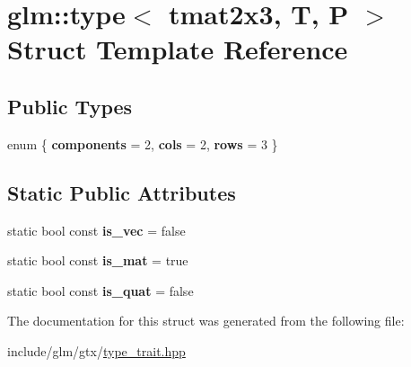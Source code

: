 \hypertarget{structglm_1_1type_3_01tmat2x3_00_01T_00_01P_01_4}{}\section{glm\+:\+:type$<$ tmat2x3, T, P $>$ Struct Template Reference}
\label{structglm_1_1type_3_01tmat2x3_00_01T_00_01P_01_4}
\subsection*{Public Types}
\begin{DoxyCompactItemize}
\item 
\mbox{\label{structglm_1_1type_3_01tmat2x3_00_01T_00_01P_01_4_a0e36075ad18b3fc9ca89e50736e389b0}} 
enum \{ {\bfseries components} = 2, 
{\bfseries cols} = 2, 
{\bfseries rows} = 3
 \}
\end{DoxyCompactItemize}
\subsection*{Static Public Attributes}
\begin{DoxyCompactItemize}
\item 
\mbox{\label{structglm_1_1type_3_01tmat2x3_00_01T_00_01P_01_4_aaf1b59c556fe102c644d35df40e27dda}} 
static bool const {\bfseries is\+\_\+vec} = false
\item 
\mbox{\label{structglm_1_1type_3_01tmat2x3_00_01T_00_01P_01_4_a6ab5d376d2ef7072813e3836fc9ccf95}} 
static bool const {\bfseries is\+\_\+mat} = true
\item 
\mbox{\label{structglm_1_1type_3_01tmat2x3_00_01T_00_01P_01_4_a2d2bbd03e889bb34375c236c196af7c4}} 
static bool const {\bfseries is\+\_\+quat} = false
\end{DoxyCompactItemize}


The documentation for this struct was generated from the following file\+:\begin{DoxyCompactItemize}
\item 
include/glm/gtx/\hyperlink{type__trait_8hpp}{type\+\_\+trait.\+hpp}\end{DoxyCompactItemize}
